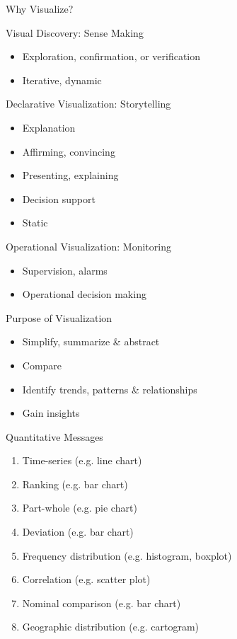 \documentclass[ignorenonframetext,xcolor=x11names]{beamer}
\begin{document}
\begin{frame}{Why Visualize?}
\begin{block}{Visual Discovery: Sense Making}
  \begin{itemize}
  \item \alert{Exploration}, confirmation, or verification
  \item Iterative, dynamic
  \end{itemize}
\end{block}

\begin{block}{Declarative Visualization: Storytelling}
  \begin{itemize}
  \item \alert{Explanation}
  \item Affirming, convincing
  \item Presenting, explaining
  \item Decision support
  \item Static
  \end{itemize}
\end{block}

\begin{block}{Operational Visualization: Monitoring}
	\begin{itemize}
		\item Supervision, alarms
		\item Operational decision making
	\end{itemize}
\end{block}
\end{frame}

\begin{frame}{Purpose of Visualization}
\begin{itemize}
  \item Simplify, summarize \& abstract
  \item Compare
  \item Identify trends, patterns \& relationships
  \item Gain insights
\end{itemize}
\end{frame}

\begin{frame}{Quantitative Messages}
\begin{enumerate}
   \item Time-series (e.g. line chart)
   \item Ranking (e.g. bar chart)
   \item Part-whole (e.g. pie chart)
   \item Deviation (e.g. bar chart)
   \item Frequency distribution (e.g. histogram, boxplot)
   \item Correlation (e.g. scatter plot)
   \item Nominal comparison (e.g. bar chart)
   \item Geographic distribution (e.g. cartogram)
\end{enumerate}
\end{frame}
\end{document}
